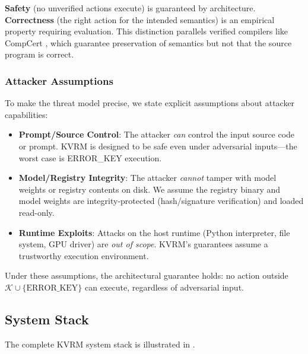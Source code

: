 \documentclass[11pt,a4paper]{article}
\begin{document}
\textbf{Safety} (no unverified actions execute) is guaranteed by architecture. \textbf{Correctness} (the right action for the intended semantics) is an empirical property requiring evaluation. This distinction parallels verified compilers like CompCert \citep{leroy2009compcert}, which guarantee preservation of semantics but not that the source program is correct.

\subsubsection{Attacker Assumptions}

To make the threat model precise, we state explicit assumptions about attacker capabilities:

\begin{itemize}
    \item \textbf{Prompt/Source Control}: The attacker \textit{can} control the input source code or prompt. KVRM is designed to be safe even under adversarial inputs---the worst case is ERROR\_KEY execution.
    \item \textbf{Model/Registry Integrity}: The attacker \textit{cannot} tamper with model weights or registry contents on disk. We assume the registry binary and model weights are integrity-protected (hash/signature verification) and loaded read-only.
    \item \textbf{Runtime Exploits}: Attacks on the host runtime (Python interpreter, file system, GPU driver) are \textit{out of scope}. KVRM's guarantees assume a trustworthy execution environment.
\end{itemize}

Under these assumptions, the architectural guarantee holds: no action outside $\mathcal{K} \cup \{\text{ERROR\_KEY}\}$ can execute, regardless of adversarial input.

\subsection{System Stack}

The complete KVRM system stack is illustrated in .
\end{document}
